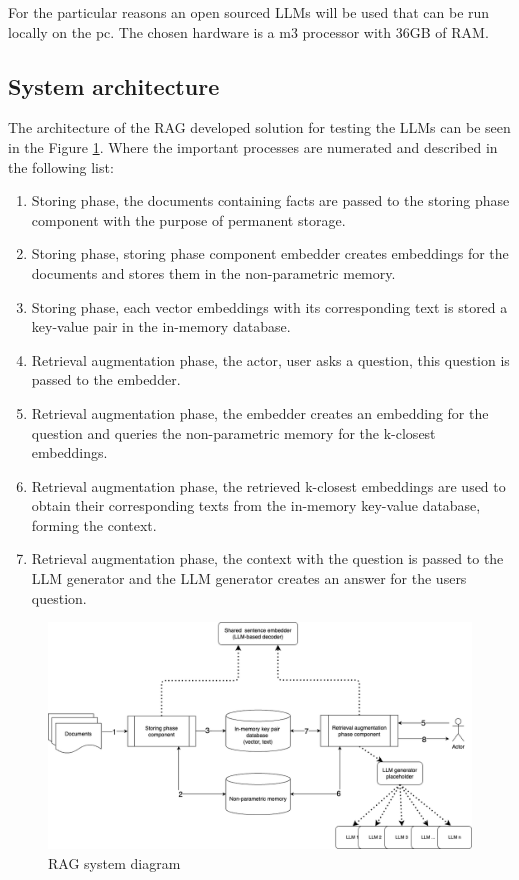 \documentclass{wseas}
\begin{document}
For the particular reasons an open sourced LLMs will be used that can be
run locally on the pc. The chosen hardware is a m3 processor with 36GB
of RAM.

\subsection{System architecture}
The architecture of the RAG developed solution for testing the LLMs can be seen in the Figure \ref{fig:rag_system_diagram_figure}. 
Where the important processes are numerated and described in the following list: 

\begin{enumerate}
  \item Storing phase, the documents containing facts are passed to the storing phase component with the purpose of permanent storage.
  \item Storing phase, storing phase component embedder creates embeddings for the documents and stores them in the non-parametric memory.
  \item Storing phase, each vector embeddings with its corresponding text is stored a key-value pair in the in-memory database.
  \item Retrieval augmentation phase, the actor, user asks a question, this question is passed to the embedder.
  \item Retrieval augmentation phase, the embedder creates an embedding for the question and queries the non-parametric memory for the k-closest embeddings.
  \item Retrieval augmentation phase, the retrieved k-closest embeddings are used to obtain their corresponding texts from the in-memory key-value database, forming the context.
  \item Retrieval augmentation phase, the context with the question is passed to the LLM generator and the LLM generator creates an answer for the users question.
\end{enumerate}

\begin{figure}[htbp]
  \centering
  \includegraphics[width=\linewidth]{resources/v1/ragSystemArhitecture.png}
  \caption{RAG system diagram}
  \label{fig:rag_system_diagram_figure}
\end{figure}
\end{document}
